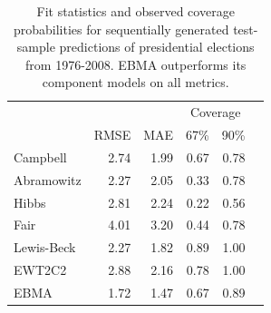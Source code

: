 \documentclass[12pt,fullpage,endnotes]{article}
\begin{document}

\begin{table}[p]
  \caption{\footnotesize Fit statistics and observed coverage
    probabilities for sequentially generated test-sample predictions
    of presidential elections from 1976-2008.  EBMA outperforms its
    component models on all metrics.}
\label{Pres-Res} \small
\begin{center}
\begin{tabular}{lrrrrr}
\toprule
                        &              &              & \multicolumn{2}{c}{Coverage} \\ 
                    	&	RMSE&	MAE	&67\% &   90\%      \\
\midrule
Campbell & 2.74 & 1.99 & 0.67 & 0.78 \\ 
  Abramowitz & 2.27 & 2.05 & 0.33 & 0.78 \\ 
  Hibbs & 2.81 & 2.24 & 0.22 & 0.56 \\ 
  Fair & 4.01 & 3.20 & 0.44 & 0.78 \\ 
  Lewis-Beck & 2.27 & 1.82 & 0.89 & 1.00 \\ 
  EWT2C2 & 2.88 & 2.16 & 0.78 & 1.00 \\ 
  EBMA & 1.72 & 1.47 & 0.67 & 0.89 \\
\bottomrule
\end{tabular}
\end{center}
\end{table}
\end{document}
